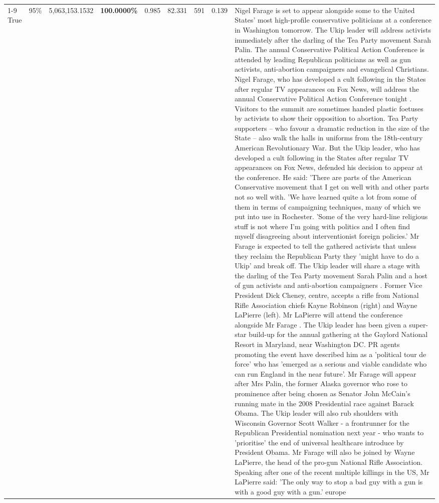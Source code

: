 \begin{table}[H]
\begin{tabular}{lllrlllll}
\cline{1-9} \cline{2-9}
True & 95\% & 5,063,153.1532 & \bfseries \color{red} 100.0000\% & 0.985 & 82.331 & 591 & 0.139 & Nigel Farage is set to appear alongside some to the United States' most high-profile conservative politicians at a conference in Washington tomorrow. The Ukip leader will address activists immediately after the darling of the Tea Party movement Sarah Palin. The annual Conservative Political Action Conference is attended by leading Republican politicians as well as gun activists, anti-abortion campaigners and evangelical Christians. Nigel Farage, who has developed a cult following in the States after regular TV appearances on Fox News, will address the annual Conservative Political Action Conference tonight . Visitors to the summit are sometimes handed plastic foetuses by activists to show their opposition to abortion. Tea Party supporters – who favour a dramatic reduction in the size of the State – also walk the halls in uniforms from the 18th-century American Revolutionary War. But the Ukip leader, who has developed a cult following in the States after regular TV appearances on Fox News, defended his decision to appear at the conference. He said: 'There are parts of the American Conservative movement that I get on well with and other parts not so well with. 'We have learned quite a lot from some of them in terms of campaigning techniques, many of which we put into use in Rochester. 'Some of the very hard-line religious stuff is not where I'm going with politics and I often find myself disagreeing about interventionist foreign policies.' Mr Farage is expected to tell the gathered activists that unless they reclaim the Republican Party they 'might have to do a Ukip' and break off. The Ukip leader will share a stage with the darling of the Tea Party movement Sarah Palin and a host of gun activists and anti-abortion campaigners . Former Vice President Dick Cheney, centre, accepts a rifle from National Rifle Association chiefs Kayne Robinson (right) and Wayne LaPierre (left). Mr LaPierre will attend the conference alongside Mr Farage . The Ukip leader has been given a super-star build-up for the annual gathering at the Gaylord National Resort in Maryland, near Washington DC. PR agents promoting the event have described him as a 'political tour de force' who has 'emerged as a serious and viable candidate who can run England in the near future'. Mr Farage will appear after Mrs Palin, the former Alaska governor who rose to prominence after being chosen as Senator John McCain's running mate in the 2008 Presidential race against Barack Obama. The Ukip leader will also rub shoulders with Wisconsin Governor Scott Walker - a frontrunner for the Republican Presidential nomination next year - who wants to 'prioritise' the end of universal healthcare introduce by President Obama. Mr Farage will also be joined by Wayne LaPierre, the head of the pro-gun National Rifle Association. Speaking after one of the recent multiple killings in the US, Mr LaPierre said: 'The only way to stop a bad guy with a gun is with a good guy with a gun.' europe \\

\end{tabular}
\end{table}
